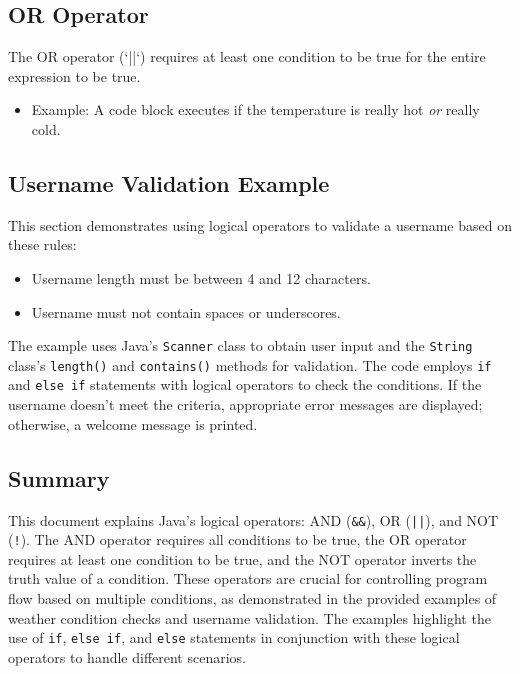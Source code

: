 \documentclass{article}
\begin{document}
\subsection{OR Operator}

The OR operator (`||`) requires at least one condition to be true for the entire expression to be true.

\begin{itemize}
    \item Example: A code block executes if the temperature is really hot \textit{or} really cold.
\end{itemize}


\subsection{Username Validation Example}

This section demonstrates using logical operators to validate a username based on these rules:

\begin{itemize}
    \item Username length must be between 4 and 12 characters.
    \item Username must not contain spaces or underscores.
\end{itemize}

The example uses Java's \texttt{Scanner} class to obtain user input and the \texttt{String} class's \texttt{length()} and \texttt{contains()} methods for validation.  The code employs \texttt{if} and \texttt{else if} statements with logical operators to check the conditions.  If the username doesn't meet the criteria, appropriate error messages are displayed; otherwise, a welcome message is printed.


\subsection{Summary}

This document explains Java's logical operators: AND (\texttt{\&\&}), OR (\texttt{||}), and NOT (\texttt{!}).  The AND operator requires all conditions to be true, the OR operator requires at least one condition to be true, and the NOT operator inverts the truth value of a condition. These operators are crucial for controlling program flow based on multiple conditions, as demonstrated in the provided examples of weather condition checks and username validation.  The examples highlight the use of \texttt{if}, \texttt{else if}, and \texttt{else} statements in conjunction with these logical operators to handle different scenarios.
\end{document}
